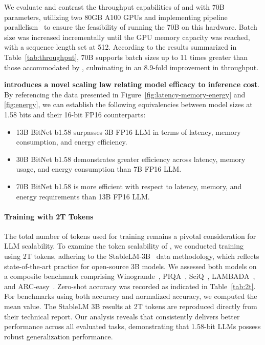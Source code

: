 We evaluate and contrast the throughput capabilities of  and  with 70B parameters, utilizing two 80GB A100 GPUs and implementing pipeline parallelism~\cite{gpipe} to ensure the feasibility of running the  70B on this hardware. Batch size was increased incrementally until the GPU memory capacity was reached, with a sequence length set at 512. According to the results summarized in Table~\ref{tab:throughput},  70B supports batch sizes up to 11 times greater than those accommodated by , culminating in an 8.9-fold improvement in throughput.

\textbf{ introduces a novel scaling law relating model efficacy to inference cost}. By referencing the data presented in Figure~\ref{fig:latency-memory-energy} and \ref{fig:energy}, we can establish the following equivalencies between model sizes at 1.58 bits and their 16-bit FP16 counterparts:

\begin{itemize}
    \item 13B BitNet b1.58 surpasses 3B FP16 LLM in terms of latency, memory consumption, and energy efficiency.
    \item 30B BitNet b1.58 demonstrates greater efficiency across latency, memory usage, and energy consumption than 7B FP16 LLM.
    \item 70B BitNet b1.58 is more efficient with respect to latency, memory, and energy requirements than 13B FP16 LLM.
\end{itemize}

\paragraph{Training with 2T Tokens}

The total number of tokens used for training remains a pivotal consideration for LLM scalability. To examine the token scalability of , we conducted training using 2T tokens, adhering to the StableLM-3B~\cite{StableLM-3B-4E1T} data methodology, which reflects state-of-the-art practice for open-source 3B models. We assessed both models on a composite benchmark comprising Winogrande~\cite{winoGrande}, PIQA~\cite{piqa}, SciQ~\cite{sciq}, LAMBADA~\cite{lambada}, and ARC-easy~\cite{arc}. Zero-shot accuracy was recorded as indicated in Table~\ref{tab:2t}. For benchmarks using both accuracy and normalized accuracy, we computed the mean value. The StableLM 3B results at 2T tokens are reproduced directly from their technical report. Our analysis reveals that  consistently delivers better performance across all evaluated tasks, demonstrating that 1.58-bit LLMs possess robust generalization performance.

